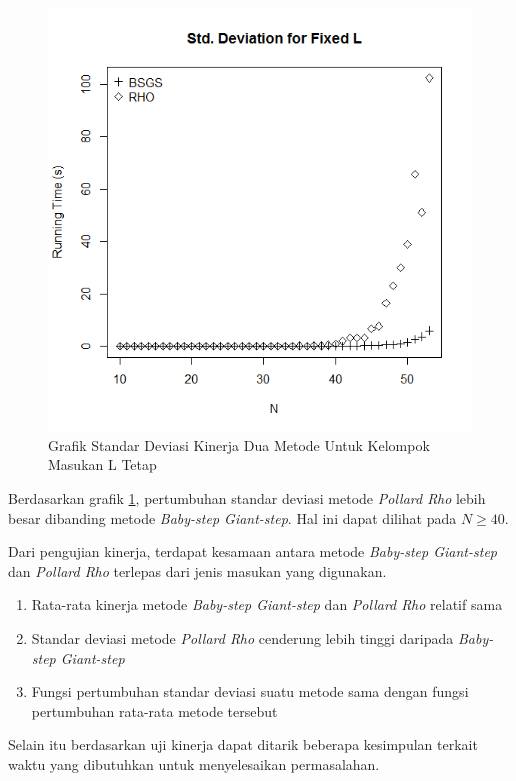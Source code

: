 \begin{figure}[h!]
	\Centering
	\includegraphics[angle=0, scale=0.55]{bab5/img/sdev-fixed-l}
	\caption{Grafik Standar Deviasi Kinerja Dua Metode Untuk Kelompok Masukan L Tetap}
	\label{fig:stddev_fixed_l}
\end{figure}

Berdasarkan grafik \ref{fig:stddev_fixed_l}, pertumbuhan standar deviasi metode \textit{Pollard Rho} lebih besar dibanding metode \textit{Baby-step Giant-step}. Hal ini dapat dilihat pada $ N \geq 40 $.

Dari pengujian kinerja, terdapat kesamaan antara metode \textit{Baby-step Giant-step} dan \textit{Pollard Rho} terlepas dari jenis masukan yang digunakan.

\begin{enumerate}
	\item Rata-rata kinerja metode \textit{Baby-step Giant-step} dan \textit{Pollard Rho} relatif sama
	\item Standar deviasi metode \textit{Pollard Rho} cenderung lebih tinggi daripada \textit{Baby-step Giant-step}
	\item Fungsi pertumbuhan standar deviasi suatu metode sama dengan fungsi pertumbuhan rata-rata metode tersebut
\end{enumerate}

Selain itu berdasarkan uji kinerja dapat ditarik beberapa kesimpulan terkait waktu yang dibutuhkan untuk menyelesaikan permasalahan.


